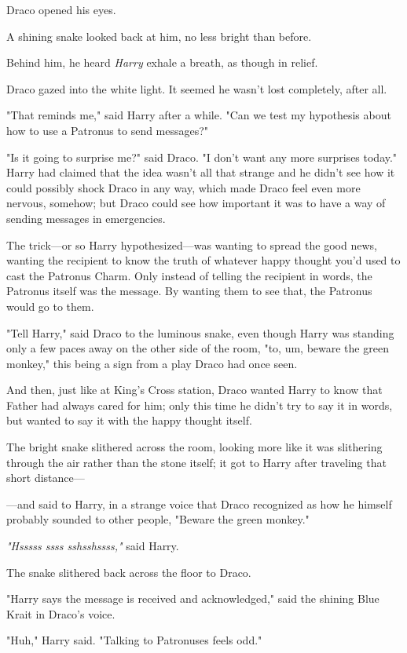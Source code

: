 Draco opened his eyes.

A shining snake looked back at him, no less bright than before.

Behind him, he heard \emph{Harry} exhale a breath, as though in relief.

Draco gazed into the white light. It seemed he wasn't lost completely, after
all.

"That reminds me," said Harry after a while. "Can we test my hypothesis about
how to use a Patronus to send messages?"

"Is it going to surprise me?" said Draco. "I don't want any more surprises
today."
\sbreak
Harry had claimed that the idea wasn't all that strange and he didn't see how
it could possibly shock Draco in any way, which made Draco feel even more
nervous, somehow; but Draco could see how important it was to have a way of
sending messages in emergencies.

The trick---or so Harry hypothesized---was wanting to spread the good news,
wanting the recipient to know the truth of whatever happy thought you'd used to
cast the Patronus Charm. Only instead of telling the recipient in words, the
Patronus itself was the message. By wanting them to see that, the Patronus
would go to them.

"Tell Harry," said Draco to the luminous snake, even though Harry was standing
only a few paces away on the other side of the room, "to, um, beware the green
monkey," this being a sign from a play Draco had once seen.

And then, just like at King's Cross station, Draco wanted Harry to know that
Father had always cared for him; only this time he didn't try to say it in
words, but wanted to say it with the happy thought itself.

The bright snake slithered across the room, looking more like it was slithering
through the air rather than the stone itself; it got to Harry after traveling
that short distance---

---and said to Harry, in a strange voice that Draco recognized as how he
himself probably sounded to other people, "Beware the green monkey."

\emph{"Hsssss ssss sshsshssss,"} said Harry.

The snake slithered back across the floor to Draco.

"Harry says the message is received and acknowledged," said the shining Blue
Krait in Draco's voice.

"Huh," Harry said. "Talking to Patronuses feels odd."

